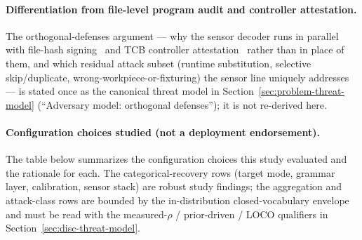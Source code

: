 \documentclass[sensors,article,submit,moreauthors,pdftex]{Definitions/mdpi}
\begin{document}
\paragraph{Differentiation from file-level program audit and controller attestation.} The orthogonal-defenses argument --- why the sensor decoder runs in parallel with file-hash signing~\cite{wells2014cyber,nist2024fmnet,belikovetsky2017drowned} and TCB controller attestation~\cite{zonouz2014plc} rather than in place of them, and which residual attack subset (runtime substitution, selective skip/duplicate, wrong-workpiece-or-fixturing) the sensor line uniquely addresses --- is stated once as the canonical threat model in Section~\ref{sec:problem-threat-model} (``Adversary model: orthogonal defenses''); it is not re-derived here.

\paragraph{Configuration choices studied (not a deployment endorsement).} The table below summarizes the configuration choices this study evaluated and the rationale for each. The categorical-recovery rows (target mode, grammar layer, calibration, sensor stack) are robust study findings; the aggregation and attack-class rows are bounded by the in-distribution closed-vocabulary envelope and must be read with the measured-$\rho$ / prior-driven / LOCO qualifiers in Section~\ref{sec:disc-threat-model}.
\end{document}
